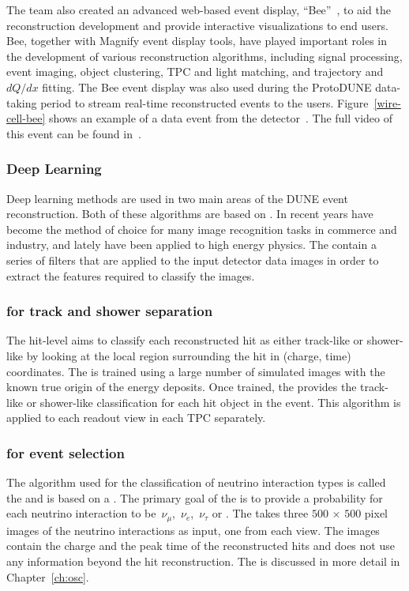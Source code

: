 The  team also created an advanced web-based \threed event display, ``Bee''~\cite{wire-cell-bee}, to aid the reconstruction development and provide interactive visualizations to end users.  Bee, together with \twod Magnify event 
display tools, have played important roles in 
the development of various reconstruction algorithms, including signal processing, \threed event 
imaging, object clustering, TPC and light matching, and trajectory and $dQ/dx$ fitting. The Bee event display 
was also used during the ProtoDUNE data-taking period to stream real-time reconstructed events to the users.
Figure~\ref{wire-cell-bee} shows an example of a data event from the  detector~\cite{ref:wc_bee}. 
The full video of this event can be found in~\cite{ref:bee_video}.


\subsubsection{Deep Learning}\label{sec:deeplearning}

Deep learning methods are used %
in two main areas of the DUNE event reconstruction. %
Both of these algorithms are based on . 
In recent years  have become the method of choice for many image recognition tasks in commerce and industry, and lately have been applied to high energy physics. The  contain a series of filters that are applied to the input detector data images in order to extract the features required to classify the images.

\subsubsection{ for track and shower separation}
The hit-level  aims to classify each reconstructed hit as either track-like or shower-like by looking at the local region surrounding the hit in (charge, time) coordinates.  The  is trained using a large number of simulated images with the known true origin of the energy deposits. Once trained, the  provides the track-like or shower-like classification for each hit object in the event. This algorithm is applied to each readout view in each TPC separately. %

\subsubsection{ for event selection}
The algorithm used for the classification of neutrino interaction types is called the  and is  based on a . The primary goal of the  is to provide a probability for each neutrino interaction to be $\,\nu_\mu$, $\,\nu_e$, $\,\nu_\tau$ or . The  takes three $500\,\times\,500$ pixel images of the neutrino interactions as input, one from each view. The images contain the charge and the peak time of the reconstructed hits and does not use any information beyond the hit reconstruction. The  is discussed in more detail in Chapter~\ref{ch:osc}. 


